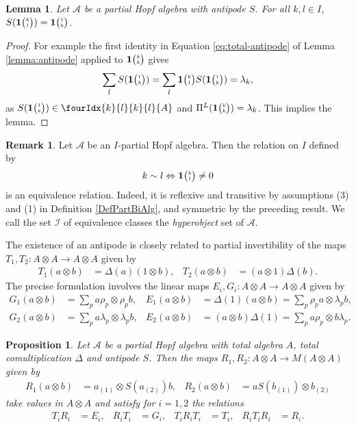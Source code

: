 \documentclass[10pt]{article}
\newcommand{\Grt}[3]{#1{\tiny {\begin{pmatrix} #2\\#3\end{pmatrix}}}}
\newcommand{\UnitC}[2]{\Grt{\mathbf{1}}{#1}{#2}}
\newcommand{\Gr}[5]{\fourIdx{#2}{#4}{#3}{#5}{#1}}%
\newtheorem{Lem}[Theorem]{Lemma}
\newtheorem{Prop}[Theorem]{Proposition}
\theoremstyle{definition}
\newtheorem{Rem}[Theorem]{Remark}
\numberwithin{equation}{section}
\begin{document}
\begin{Lem}\label{LemAntiUnit} Let $\mathscr{A}$ be a partial Hopf algebra with antipode $S$. For all $k,l\in I$, $S(\UnitC{k}{l}) = \UnitC{l}{k}$.
\end{Lem}
\begin{proof} For example the first identity in Equation \eqref{eq:total-antipode} of Lemma \ref{lemma:antipode} applied to $\UnitC{k}{k}$ gives \[\sum_l S(\UnitC{l}{k}) = \sum_l \UnitC{k}{l}S(\UnitC{l}{k}) = \lambda_k,\] as $S(\UnitC{l}{k}) \in \Gr{A}{k}{k}{l}{l}$ and $\Pi^{L}(\UnitC{k}{k}) = \lambda_k$. This implies the lemma.
\end{proof} 
\begin{Rem} \label{remark:index-equivalence}
  Let $\mathscr{A}$ be an $I$-partial Hopf algebra. Then the relation
  on $I$ defined by
  \begin{align*}
    k \sim l \Leftrightarrow \UnitC{k}{l} \neq 0
  \end{align*}
is an equivalence relation. Indeed, it is reflexive and transitive by
assumptions (3) and (1) in Definition \ref{DefPartBiAlg}, and
symmetric by the preceding result. We call the set $\mathscr{I}$ of equivalence classes the \emph{hyperobject} set of $\mathscr{A}$. %
\end{Rem}
The existence of an antipode is closely related to partial invertibility of
the maps $T_{1},T_{2} \colon A \otimes A \to A\otimes A$ given by
\begin{align} \label{eq:wt-12}
  T_{1} (a\otimes b)&= \Delta(a)(1 \otimes b), &
  T_{2} (a\otimes b)&= (a \otimes 1)\Delta(b).
 \end{align}
The precise formulation involves the linear maps $E_{i},G_{i}
 \colon A\otimes A\to A\otimes A$ given by
\begin{align} \label{eq:e1g1}
  G_{1}(a\otimes b) &=
 \sum_{p} a\rho_{p} \otimes \rho_{p}b, &  E_{1}(a \otimes b) &=\Delta(1)(a\otimes b)=\sum_{p} \rho_{p}a\otimes \lambda_{p}b, \\ \label{eq:e2g2}
 G_{2}(a \otimes b) &= \sum_{p} a\lambda_{p} \otimes
    \lambda_{p}b, &
E_{2}(a\otimes b) &= (a\otimes b)\Delta(1)=\sum_{p} a\rho_{p} \otimes b\lambda_{p}.
\end{align}
\begin{Prop} \label{prop:riti}
  Let $\mathscr{A}$ be a partial Hopf algebra with total algebra $A$,
  total comultiplication $\Delta$ and antipode  $S$. Then the maps
  $R_{1},R_{2} \colon A \otimes A \to M(A \otimes A)$ given by
  \begin{align*}
    R_{1}(a \otimes b) &= a_{(1)}\otimes S(a_{(2)})b, &
    R_{2}(a\otimes b) &= aS(b_{(1)})\otimes b_{(2)}
  \end{align*}
  take values in $A\otimes A$ and satisfy for $i=1,2$ the relations
  \begin{align} \label{eq:riti}
    T_{i}R_{i}&=E_{i}, & R_{i}T_{i}&= G_{i}, & T_{i}R_{i}T_{i}&= T_{i}, & R_{i}T_{i}R_{i} &= R_{i}.
  \end{align}
\end{Prop}
\end{document}
